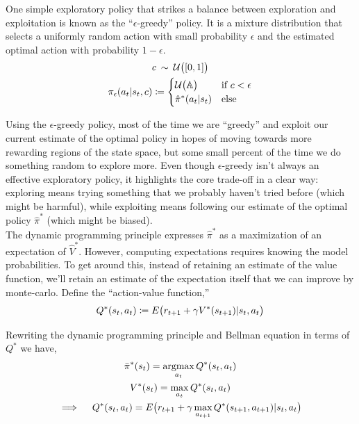One simple exploratory policy that strikes a balance between exploration and exploitation is known as the ``$\epsilon$-greedy'' policy. It is a mixture distribution that selects a uniformly random action with small probability $\epsilon$ and the estimated optimal action with probability $1-\epsilon$.
\begin{gather*}
c\ \operatorname*{\sim}\ \mathcal{U}\big{(}[0, 1]\big{)}\\
\pi_\epsilon(a_t|s_t, c) \coloneqq \begin{cases} \mathcal{U}\big{(}\mathbb{A}\big{)} &\text{if}\ c < \epsilon \\ \hat{\pi}^*(a_t|s_t) &\text{else}\end{cases}
\end{gather*}

Using the $\epsilon$-greedy policy, most of the time we are ``greedy'' and exploit our current estimate of the optimal policy in hopes of moving towards more rewarding regions of the state space, but some small percent of the time we do something random to explore more. Even though $\epsilon$-greedy isn't always an effective exploratory policy, it highlights the core trade-off in a clear way: exploring means trying something that we probably haven't tried before (which might be harmful), while exploiting means following our estimate of the optimal policy $\hat{\pi}^*$ (which might be biased).\\

The dynamic programming principle expresses $\hat{\pi}^*$ as a maximization of an expectation of $\hat{V}^*$. However, computing expectations requires knowing the model probabilities. To get around this, instead of retaining an estimate of the value function, we'll retain an estimate of the expectation itself that we can improve by monte-carlo. Define the ``action-value function,''
\begin{equation*}
Q^*(s_t, a_t) \coloneqq E\big{(}r_{t+1} + \gamma V^*(s_{t+1}) | s_t, a_t\big{)}
\end{equation*}

Rewriting the dynamic programming principle and Bellman equation in terms of $Q^*$ we have,
\begin{gather*}
\bar{\pi}^*(s_t) = \operatorname*{argmax}_{a_t} Q^*(s_t, a_t)\\
V^*(s_t) = \max_{a_t} Q^*(s_t, a_t)\\
\implies\ \ \ Q^*(s_t, a_t) = E\big{(}r_{t+1} + \gamma \max_{a_{t+1}} Q^*(s_{t+1}, a_{t+1}) | s_t, a_t\big{)}
\end{gather*}

